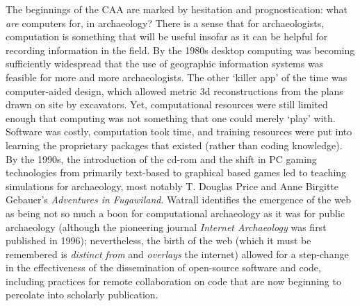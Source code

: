 \documentclass[english,]{book}
\begin{document}
The beginnings of the CAA are marked by hesitation and prognostication:
what \emph{are} computers for, in archaeology? There is a sense that for
archaeologists, computation is something that will be useful insofar as
it can be helpful for recording information in the field. By the 1980s
desktop computing was becoming sufficiently widespread that the use of
geographic information systems was feasible for more and more
archaeologists. The other `killer app' of the time was computer-aided
design, which allowed metric 3d reconstructions from the plans drawn on
site by excavators. Yet, computational resources were still limited
enough that computing was not something that one could merely `play'
with. Software was costly, computation took time, and training resources
were put into learning the proprietary packages that existed (rather
than coding knowledge). By the 1990s, the introduction of the cd-rom and
the shift in PC gaming technologies from primarily text-based to
graphical based games led to teaching simulations for archaeology, most
notably T. Douglas Price and Anne Birgitte Gebauer's \emph{Adventures in
Fugawiland}. Watrall identifies the emergence of the web as being not so
much a boon for computational archaeology as it was for public
archaeology (although the pioneering journal \emph{Internet Archaeology}
was first published in 1996); nevertheless, the birth of the web (which
it must be remembered is \emph{distinct from} and \emph{overlays} the
internet) allowed for a step-change in the effectiveness of the
dissemination of open-source software and code, including practices for
remote collaboration on code that are now beginning to percolate into
scholarly publication.
\end{document}
